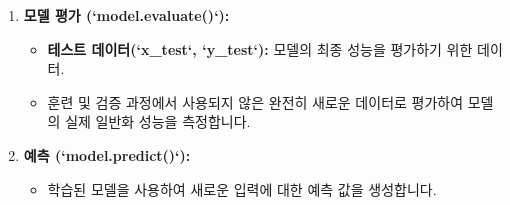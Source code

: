 \documentclass[11pt,a4paper]{article}
\begin{document}
\begin{enumerate}
\begin{itemize}
        \item \textbf{배치 크기(`batch_size`):} 한 번의 가중치 업데이트에 사용될 샘플 수.
        \item \textbf{검증 데이터(`validation_data`):} 훈련 중 모델의 일반화 성능을 평가하기 위한 데이터.
        \item \textbf{콜백(`callbacks`):} EarlyStopping, ModelCheckpoint 등을 사용하여 학습 과정 제어.
    \end{itemize}
    \item \textbf{모델 평가 (`model.evaluate()`):}
    \begin{itemize}
        \item \textbf{테스트 데이터(`x_test`, `y_test`):} 모델의 최종 성능을 평가하기 위한 데이터.
        \item 훈련 및 검증 과정에서 사용되지 않은 완전히 새로운 데이터로 평가하여 모델의 실제 일반화 성능을 측정합니다.
    \end{itemize}
    \item \textbf{예측 (`model.predict()`):}
    \begin{itemize}
        \item 학습된 모델을 사용하여 새로운 입력에 대한 예측 값을 생성합니다.
    \end{itemize}
\end{enumerate}
\end{document}
